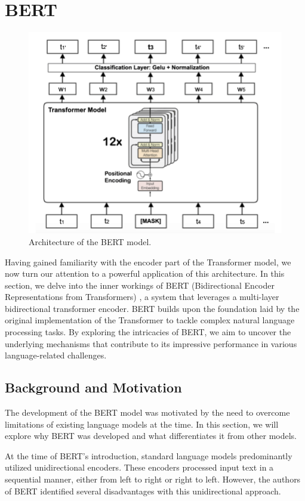 \documentclass[a4paper,10pt]{report} %
\begin{document}
\section{BERT}
\begin{figure} %
  \centering
  \includegraphics[width=12cm]{img/bert_architecture.png}
  \caption{Architecture of the BERT model. \cite{bertArchi}}
  \label{fig:bert_architecture}
\end{figure}
Having gained familiarity with the encoder part of the Transformer model, we now turn our attention to a powerful application of this architecture. In this section, we delve into the inner workings of BERT (Bidirectional Encoder Representations from Transformers) \cite{bert}, a system that leverages a multi-layer bidirectional transformer encoder. BERT builds upon the foundation laid by the original implementation of the Transformer to tackle complex natural language processing tasks. By exploring the intricacies of BERT, we aim to uncover the underlying mechanisms that contribute to its impressive performance in various language-related challenges.

\subsection{Background and Motivation}
The development of the BERT model was motivated by the need to overcome limitations of existing language models at the time. In this section, we will explore why BERT was developed and what differentiates it from other models.

At the time of BERT's introduction, standard language models predominantly utilized unidirectional encoders. These encoders processed input text in a sequential manner, either from left to right or right to left. However, the authors of BERT identified several disadvantages with this unidirectional approach.
\end{document}

